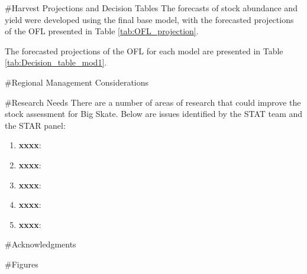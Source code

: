 \documentclass[12pt,]{article}
\begin{document}
\newpage

\#Harvest Projections and Decision Tables The forecasts of stock
abundance and yield were developed using the final base model, with the
forecasted projections of the OFL presented in Table
\ref{tab:OFL_projection}.

The forecasted projections of the OFL for each model are presented in
Table \ref{tab:Decision_table_mod1}.

\newpage

\#Regional Management Considerations \newpage

\#Research Needs There are a number of areas of research that could
improve the stock assessment for Big Skate. Below are issues identified
by the STAT team and the STAR panel:

\begin{enumerate}

\item \textbf{xxxx}: 

\item \textbf{xxxx}:

\item \textbf{xxxx}:

\item \textbf{xxxx}:

\item \textbf{xxxx}:

\end{enumerate}

\#Acknowledgments

\newpage
\FloatBarrier
\newpage

\FloatBarrier

\FloatBarrier

\FloatBarrier
\newpage

\newpage
\FloatBarrier

\FloatBarrier

\FloatBarrier

\FloatBarrier

\newpage

\FloatBarrier

\newpage

\#Figures
\end{document}
